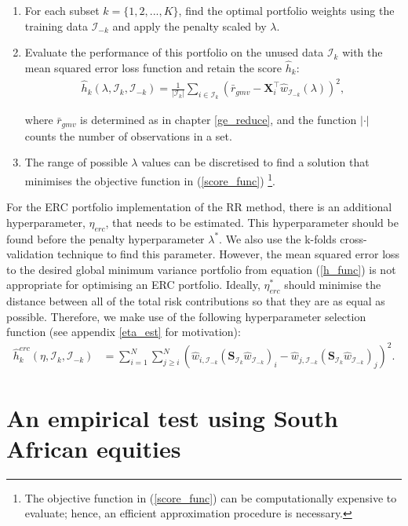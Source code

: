 \documentclass[a4paper,11pt,nocenter,bold,noupper,headcount]{mythesis}
\theoremstyle{plain}
\theoremstyle{definition}
\begin{document}
\begin{enumerate}
\item For each subset $k = \{1, 2, ..., K\}$, find the optimal portfolio weights using the training data $\mathcal{I}_{-k}$ and apply the penalty scaled by $\lambda$.
\item Evaluate the performance of this portfolio on the unused data $\mathcal{I}_k$ with the mean squared error loss function and retain the score $\hat{h}_k$:
\begin{align} \label{h_func}
\hat{h}_k (\lambda, \mathcal{I}_k, \mathcal{I}_{-k}) = \frac{1}{|\mathcal{I}_k|} \sum_{i \in \mathcal{I}_k} (\bar{r}_{gmv} - \textbf{X}_i^\intercal \hat{w}_{\mathcal{I}_{-k}}(\lambda))^2,
\end{align}

where $\bar{r}_{gmv}$ is determined as in chapter \ref{ge_reduce}, and the function $|\cdot|$ counts the number of observations in a set.

\item The range of possible $\lambda$ values can be discretised to find a solution that minimises the objective function in (\ref{score_func}) \footnote{The objective function in (\ref{score_func})  can be computationally expensive to evaluate; hence, an efficient approximation procedure is necessary.}.
\end{enumerate}

For the ERC portfolio implementation of the RR method, there is an additional hyperparameter, $\eta_{erc}$, that needs to be estimated. This hyperparameter should be found before the penalty hyperparameter $\lambda^*$. We also use the k-folds cross-validation technique to find this parameter. However, the mean squared error loss to the desired global minimum variance portfolio from equation (\ref{h_func}) is not appropriate for optimising an ERC portfolio. Ideally, $\eta_{erc}^*$ should minimise the distance between all of the total risk contributions so that they are as equal as possible. Therefore, we make use of the following hyperparameter selection function (see appendix \ref{eta_est} for motivation):
\begin{align}
\hat{h}_k^{erc} (\eta, \mathcal{I}_k, \mathcal{I}_{-k}) & = \sum_{i = 1}^N  \sum_{j \geq i}^N(\hat{w}_{i, \mathcal{I}_{-k}}(\textbf{S}_{\mathcal{I}_k} \hat{w}_{\mathcal{I}_{-k}})_i - \hat{w}_{j, \mathcal{I}_{-k}}(\textbf{S}_{\mathcal{I}_k} \hat{w}_{\mathcal{I}_{-k}})_j )^2.
\end{align}


\chapter{An empirical test using South African equities} \label{experiment}
\end{document}
